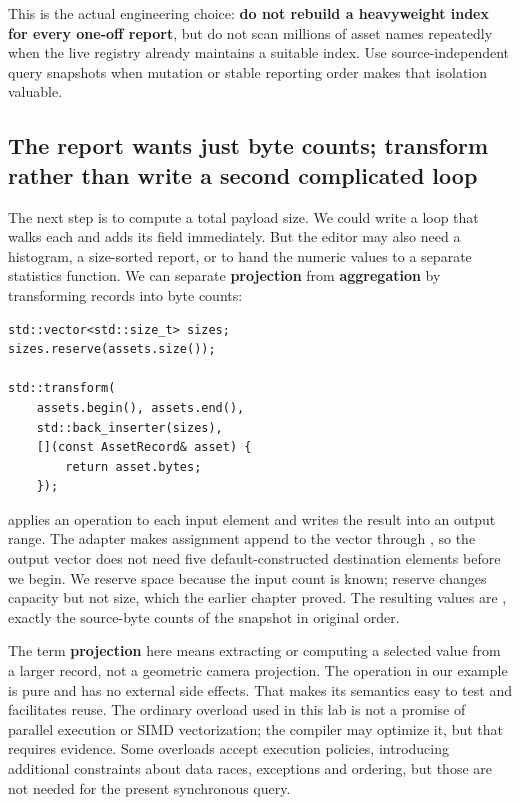 This is the actual engineering choice: \textbf{do not rebuild a heavyweight index for every one-off report}, but do not scan millions of asset names repeatedly when the live registry already maintains a suitable index. Use source-independent query snapshots when mutation or stable reporting order makes that isolation valuable.

\subsection{The report wants just byte counts; transform rather than write a second complicated loop}\label{05-engine-i-ch006-the-report-wants-just-byte-counts-transform-rather-than-write-a-second-complicated-loop}

\hypertarget{05-engine-i-ch006-the-report-wants-just-byte-counts-transform-rather-than-write-a-second-complicated-loop}{}

The next step is to compute a total payload size. We could write a loop that walks each  and adds its  field immediately. But the editor may also need a histogram, a size-sorted report, or to hand the numeric values to a separate statistics function. We can separate \textbf{projection} from \textbf{aggregation} by transforming records into byte counts:

\begin{verbatim}
std::vector<std::size_t> sizes;
sizes.reserve(assets.size());

std::transform(
    assets.begin(), assets.end(),
    std::back_inserter(sizes),
    [](const AssetRecord& asset) {
        return asset.bytes;
    });
\end{verbatim}

 applies an operation to each input element and writes the result into an output range. The  adapter makes assignment append to the vector through , so the output vector does not need five default-constructed destination elements before we begin. We reserve space because the input count is known; reserve changes capacity but not size, which the earlier chapter proved. The resulting values are \BookInlineCode{{[}48,64,16,128,48{]}}, exactly the source-byte counts of the snapshot in original order.

The term \textbf{projection} here means extracting or computing a selected value from a larger record, not a geometric camera projection. The operation in our example is pure and has no external side effects. That makes its semantics easy to test and facilitates reuse. The ordinary  overload used in this lab is not a promise of parallel execution or SIMD vectorization; the compiler may optimize it, but that requires evidence. Some overloads accept execution policies, introducing additional constraints about data races, exceptions and ordering, but those are not needed for the present synchronous query.

